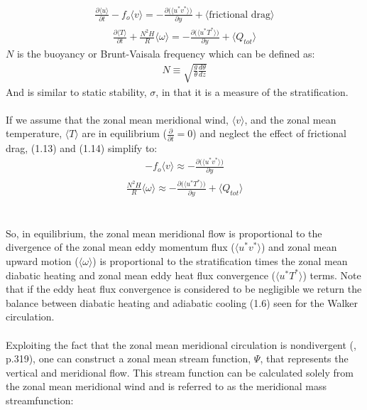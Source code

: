 \documentclass[letterpaper,12pt,titlepage,oneside,final]{book}
\begin{document}
\begin{align}
\frac{\partial{\langle{u}\rangle}}{\partial{t}} - f_{o}\langle{v}\rangle = -\frac{\partial\Big(\langle{u^{*}v^{*}}\rangle\Big)}{\partial{y}} + \langle\text{frictional drag}\rangle
\end{align}
\begin{align}
\frac{\partial{\langle{T}\rangle}}{\partial{t}} + \frac{N^{2}H}{R}\langle{\omega}\rangle = -\frac{\partial\Big(\langle{u^{*}T^{*}}\rangle\Big)}{\partial{y}} + \langle{Q_{tot}}\rangle
\end{align}
$N$ is the buoyancy or Brunt-Vaisala frequency which can be defined as: 
\begin{align}
N\equiv\sqrt{\frac{g}{\theta}\frac{d{\theta}}{dz}}
\end{align}
And is similar to static stability, $\sigma$, in that it is a measure of the stratification.
\\
\\
If we assume that the zonal mean meridional wind, $\langle{v}\rangle$, and the zonal mean temperature, $\langle{T}\rangle$ are in equilibrium ($\frac{\partial}{\partial{t}}=0$) and neglect the effect of frictional drag, (1.13) and (1.14) simplify to:
\begin{align}
-f_{o}\langle{v}\rangle \approx -\frac{\partial\Big(\langle{u^{*}v^{*}}\rangle\Big)}{\partial{y}}
\end{align}
\begin{align}
\frac{N^{2}H}{R}\langle{\omega}\rangle \approx -\frac{\partial\Big(\langle{u^{*}T^{*}}\rangle\Big)}{\partial{y}} + \langle{Q_{tot}}\rangle
\end{align}
\\
\\
So, in equilibrium, the zonal mean meridional flow is proportional to the divergence of the zonal mean eddy momentum flux ($\langle{u^{*}v^{*}}\rangle$) and zonal mean upward motion ($\langle{\omega}\rangle$) is proportional to the stratification times the zonal mean diabatic heating and zonal mean eddy heat flux convergence ($\langle{u^{*}T^{*}}\rangle$) terms. Note that if the eddy heat flux convergence is considered to be negligible we return the balance between diabatic heating and adiabatic cooling (1.6) seen for the Walker circulation. 
\\
\\
Exploiting the fact that the zonal mean meridional circulation is nondivergent (\cite{holton_introduction_2004}, p.319), one can construct a zonal mean stream function, $\Psi$, that represents the vertical and meridional flow. This stream function can be calculated solely from the zonal mean meridional wind and is referred to as the meridional mass streamfunction:
\end{document}
